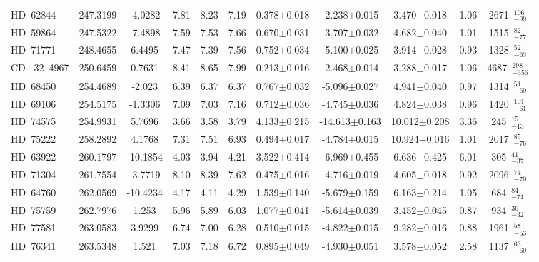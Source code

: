 {\begin{longtable}{lcccccccccc}
HD~62844 & 247.3199 & -4.0282 & 7.81 & 8.23 & 7.19 & 0.378$\pm$0.018 & -2.238$\pm$0.015 & 3.470$\pm$0.018 & 1.06 & 2671~$_{-99}^{106}$ \\
\noalign{\smallskip}
HD~59864 & 247.5322 & -7.4898 & 7.59 & 7.53 & 7.66 & 0.670$\pm$0.031 & -3.707$\pm$0.032 & 4.682$\pm$0.040 & 1.01 & 1515~$_{-77}^{82}$ \\
\noalign{\smallskip}
HD~71771 & 248.4655 & 6.4495 & 7.47 & 7.39 & 7.56 & 0.752$\pm$0.034 & -5.100$\pm$0.025 & 3.914$\pm$0.028 & 0.93 & 1328~$_{-63}^{52}$ \\
\noalign{\smallskip}
CD~-32~4967 & 250.6459 & 0.7631 & 8.41 & 8.65 & 7.99 & 0.213$\pm$0.016 & -2.468$\pm$0.014 & 3.288$\pm$0.017 & 1.06 & 4687~$_{-356}^{298}$ \\
\noalign{\smallskip}
HD~68450 & 254.4689 & -2.023 & 6.39 & 6.37 & 6.37 & 0.767$\pm$0.032 & -5.096$\pm$0.027 & 4.941$\pm$0.040 & 0.97 & 1314~$_{-60}^{51}$ \\
\noalign{\smallskip}
HD~69106 & 254.5175 & -1.3306 & 7.09 & 7.03 & 7.16 & 0.712$\pm$0.036 & -4.745$\pm$0.036 & 4.824$\pm$0.038 & 0.96 & 1420~$_{-61}^{101}$ \\
\noalign{\smallskip}
HD~74575 & 254.9931 & 5.7696 & 3.66 & 3.58 & 3.79 & 4.133$\pm$0.215 & -14.613$\pm$0.163 & 10.012$\pm$0.208 & 3.36 & 245~$_{-13}^{15}$ \\
\noalign{\smallskip}
HD~75222 & 258.2892 & 4.1768 & 7.31 & 7.51 & 6.93 & 0.494$\pm$0.017 & -4.784$\pm$0.015 & 10.924$\pm$0.016 & 1.01 & 2017~$_{-76}^{85}$ \\
\noalign{\smallskip}
HD~63922 & 260.1797 & -10.1854 & 4.03 & 3.94 & 4.21 & 3.522$\pm$0.414 & -6.969$\pm$0.455 & 6.636$\pm$0.425 & 6.01 & 305~$_{-37}^{41}$ \\
\noalign{\smallskip}
HD~71304 & 261.7554 & -3.7719 & 8.10 & 8.39 & 7.62 & 0.475$\pm$0.016 & -4.716$\pm$0.019 & 4.605$\pm$0.018 & 0.92 & 2096~$_{-70}^{74}$ \\
\noalign{\smallskip}
HD~64760 & 262.0569 & -10.4234 & 4.17 & 4.11 & 4.29 & 1.539$\pm$0.140 & -5.679$\pm$0.159 & 6.163$\pm$0.214 & 1.05 & 684~$_{-71}^{84}$ \\
\noalign{\smallskip}
HD~75759 & 262.7976 & 1.253 & 5.96 & 5.89 & 6.03 & 1.077$\pm$0.041 & -5.614$\pm$0.039 & 3.452$\pm$0.045 & 0.87 & 934~$_{-32}^{36}$ \\
\noalign{\smallskip}
HD~77581 & 263.0583 & 3.9299 & 6.74 & 7.00 & 6.28 & 0.510$\pm$0.015 & -4.822$\pm$0.015 & 9.282$\pm$0.016 & 0.88 & 1961~$_{-53}^{58}$ \\
\noalign{\smallskip}
HD~76341 & 263.5348 & 1.521 & 7.03 & 7.18 & 6.72 & 0.895$\pm$0.049 & -4.930$\pm$0.051 & 3.578$\pm$0.052 & 2.58 & 1137~$_{-60}^{63}$ \\

\end{longtable}}

